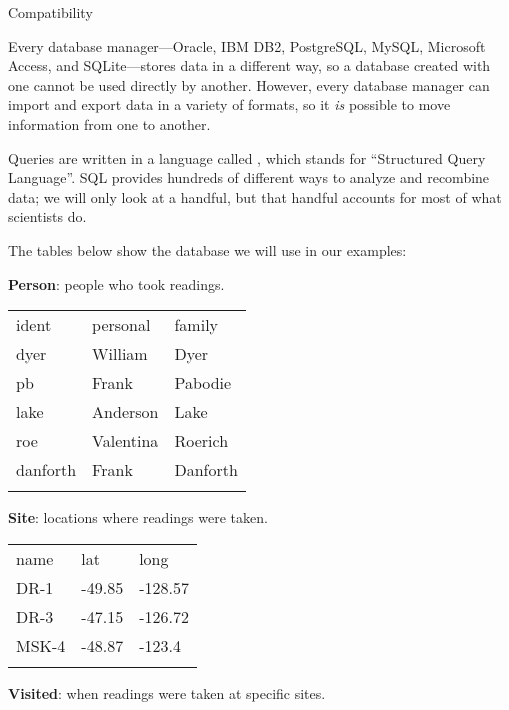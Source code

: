 \documentclass{book}
\begin{document}
\begin{swcbox}{Compatibility}

Every database manager---Oracle, IBM DB2, PostgreSQL, MySQL, Microsoft
Access, and SQLite---stores data in a different way, so a database
created with one cannot be used directly by another. However, every
database manager can import and export data in a variety of formats, so
it \emph{is} possible to move information from one to another.

\end{swcbox}

Queries are written in a language called , which
stands for ``Structured Query Language''. SQL provides hundreds of
different ways to analyze and recombine data; we will only look at a
handful, but that handful accounts for most of what scientists do.

The tables below show the database we will use in our examples:

\textbf{Person}: people who took readings.

\begin{tabular}{lll}
\hline\noalign{\medskip}
ident & personal & family
\\\noalign{\medskip}
\hline\noalign{\medskip}
dyer & William & Dyer
\\\noalign{\medskip}
pb & Frank & Pabodie
\\\noalign{\medskip}
lake & Anderson & Lake
\\\noalign{\medskip}
roe & Valentina & Roerich
\\\noalign{\medskip}
danforth & Frank & Danforth
\\\noalign{\medskip}
\hline
\end{tabular}

\textbf{Site}: locations where readings were taken.

\begin{tabular}{lll}
\hline\noalign{\medskip}
name & lat & long
\\\noalign{\medskip}
\hline\noalign{\medskip}
DR-1 & -49.85 & -128.57
\\\noalign{\medskip}
DR-3 & -47.15 & -126.72
\\\noalign{\medskip}
MSK-4 & -48.87 & -123.4
\\\noalign{\medskip}
\hline
\end{tabular}

\textbf{Visited}: when readings were taken at specific sites.
\end{document}
